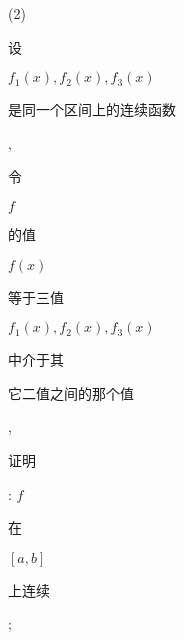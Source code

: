 \documentclass[10pt]{article}
\begin{document}
(2) \begin{CJK}{UTF8}{mj}设\end{CJK} $f_{1}(x), f_{2}(x), f_{3}(x)$ \begin{CJK}{UTF8}{mj}是同一个区间上的连续函数\end{CJK}, \begin{CJK}{UTF8}{mj}令\end{CJK} $f$ \begin{CJK}{UTF8}{mj}的值\end{CJK} $f(x)$ \begin{CJK}{UTF8}{mj}等于三值\end{CJK} $f_{1}(x), f_{2}(x), f_{3}(x)$ \begin{CJK}{UTF8}{mj}中介于其\end{CJK} \begin{CJK}{UTF8}{mj}它二值之间的那个值\end{CJK}, \begin{CJK}{UTF8}{mj}证明\end{CJK}: $f$ \begin{CJK}{UTF8}{mj}在\end{CJK} $[a, b]$ \begin{CJK}{UTF8}{mj}上连续\end{CJK};
\end{document}
